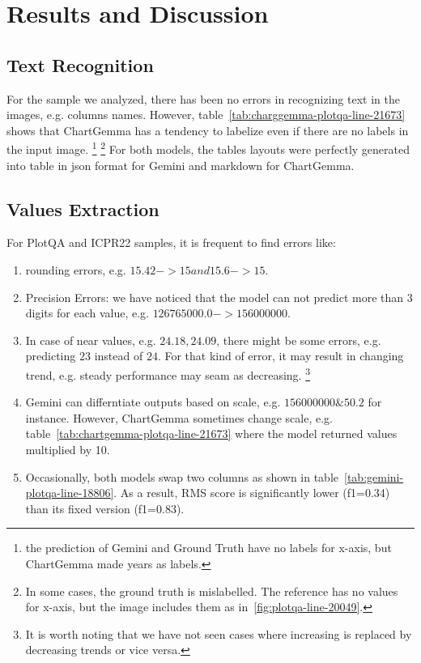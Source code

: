 \documentclass[
	letterpaper, %
]{jdf}
\begin{document}
\section{Results and Discussion}\label{sect:qualitative-analysis}
\subsection{Text Recognition}\label{ssect:qualitative-text-recognition}
For the sample we analyzed, there has been no errors in recognizing text in the images, e.g. columns names.
However, table~\ref{tab:charggemma-plotqa-line-21673} shows that ChartGemma has a tendency to labelize even if there are no labels in the input image.
\footnote{the prediction of Gemini and Ground Truth have no labels for x-axis, but ChartGemma made years as labels.}
\footnote{In some cases, the ground truth is mislabelled. The reference has no values for x-axis, but the image includes them as in~\ref{fig:plotqa-line-20049}.}
For both models, the tables layouts were perfectly generated into table in json format for Gemini and markdown for ChartGemma.

\subsection{Values Extraction}\label{ssect:values-extraction}
For PlotQA and ICPR22 samples, it is frequent to find errors like:
\begin{enumerate}
         \item rounding errors, e.g. $15.42->15 and 15.6->15$.
         \item Precision Errors: we have noticed that the model can not predict more than 3 digits for each value, e.g. $126765000.0->156000000$.
         \item In case of near values, e.g. $24.18, 24.09$, there might be some errors, e.g. predicting $23$ instead of $24$.
             For that kind of error, it may result in changing trend, e.g. steady performance may seam as decreasing.
             \footnote{It is worth noting that we have not seen cases where increasing is replaced by decreasing trends or vice versa.}
             \item Gemini can differntiate outputs based on scale, e.g. $156000000 \& 50.2$ for instance.
                 However, ChartGemma sometimes change scale, e.g. table~\ref{tab:chartgemma-plotqa-line-21673} where the model returned values multiplied by 10.
             \item Occasionally, both models swap two columns as shown in table~\ref{tab:gemini-plotqa-line-18806}.
                 As a result, RMS score is significantly lower (f1=0.34) than its fixed version (f1=0.83).
              \end{enumerate}
\end{document}

